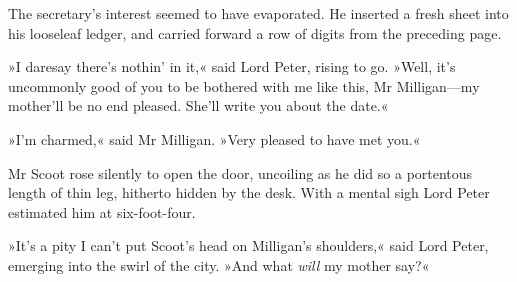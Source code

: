 The secretary's interest seemed to have evaporated. He inserted a fresh sheet into his looseleaf ledger, and carried forward a row of digits from the preceding page.

»I daresay there's nothin' in it,« said Lord Peter, rising to go. »Well, it's uncommonly good of you to be bothered with me like this, Mr Milligan\allowbreak---\allowbreak my mother'll be no end pleased. She'll write you about the date.«

»I'm charmed,« said Mr Milligan. »Very pleased to have met you.«

Mr Scoot rose silently to open the door, uncoiling as he did so a portentous length of thin leg, hitherto hidden by the desk. With a mental sigh Lord Peter estimated him at six-foot-four.

»It's a pity I can't put Scoot's head on Milligan's shoulders,« said Lord Peter, emerging into the swirl of the city. »And what \textit{will} my mother say?«